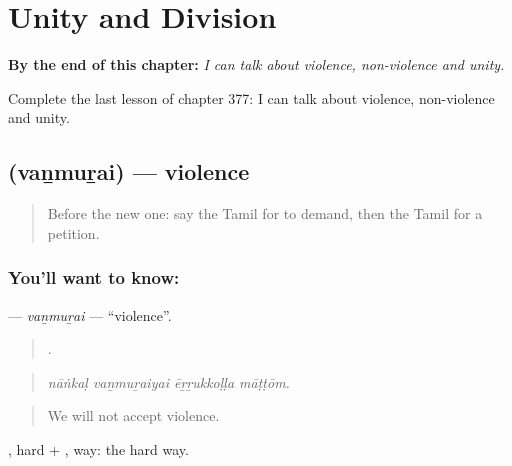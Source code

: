 
\chapter{Unity and Division}
\label{ch:ta-unity-and-division}

\begin{chapteropening}
\textbf{By the end of this chapter:} \emph{I can talk about violence, non-violence and unity.}

Complete the last lesson of chapter 377: I can talk about violence, non-violence and unity.
\end{chapteropening}

\section[\texorpdfstring{\ta{வன்முறை} (vaṉmuṟai)}{வன்முறை (vaṉmuṟai)}]{ (vaṉmuṟai) — violence}

\label{lesson:TA-C377-vanmurai}



\begin{quote}
Before the new one: say the Tamil for to demand, then the Tamil for a petition.
\end{quote}

\subsection*{You'll want to know: }
\textbf{} — \emph{vaṉmuṟai} — \textquotedblleft{}violence\textquotedblright{}.

\begin{quote}
   .
\end{quote}

\begin{quote}
\emph{nāṅkaḷ vaṉmuṟaiyai ēṟṟukkoḷḷa māṭṭōm.}
\end{quote}

\begin{quote}
We will not accept violence.
\end{quote}

, hard + , way: the hard way.

